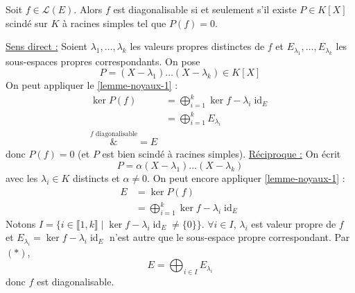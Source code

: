 	\begin{application}
		Soit $f \in \mathcal{L}(E)$. Alors $f$ est diagonalisable si et seulement s'il existe $P \in K[X]$ scindé sur $K$ à racines simples tel que $P(f) = 0$.
	\end{application}

	\begin{demonstration}
		\underline{Sens direct :} Soient $\lambda_1, \dots, \lambda_k$ les valeurs propres distinctes de $f$ et $E_{\lambda_1}, \dots, E_{\lambda_k}$ les sous-espaces propres correspondants. On pose
		\[ P = (X-\lambda_1) \dots (X-\lambda_k) \in K[X] \]
		On peut appliquer le \cref{lemme-noyaux-1} :
		\begin{align*}
			\ker{P(f)} &= \bigoplus_{i = 1}^k \ker{f - \lambda_i \operatorname{id}_E} \\
			&= \bigoplus_{i = 1}^k E_{\lambda_i} \\
			\overset{f \text{ diagonalisable}}&{=} E
		\end{align*}
		donc $P(f) = 0$ (et $P$ est bien scindé à racines simples).
		\newpar
		\underline{Réciproque :} On écrit
		\[ P = \alpha (X-\lambda_1) \dots (X-\lambda_k) \]
		avec les $\lambda_i \in K$ distincts et $\alpha \neq 0$. On peut encore appliquer \cref{lemme-noyaux-1} :
		\begin{align*}
			E &= \ker{P(f)} \\
			&= \bigoplus_{i = 1}^k \ker{f - \lambda_i \operatorname{id}_E} \tag{*}
		\end{align*}
		Notons $I = \{ i \in \llbracket 1, k \rrbracket \mid \ker{f - \lambda_i \operatorname{id}_E} \neq \{ 0 \} \}$. $\forall i \in I$, $\lambda_i$ est valeur propre de $f$ et $E_{\lambda_i} = \ker{f - \lambda_i \operatorname{id}_E}$ n'est autre que le sous-espace propre correspondant. Par $(*)$,
		\[ E = \bigoplus_{i \in I} E_{\lambda_i} \]
		donc $f$ est diagonalisable.
	\end{demonstration}

